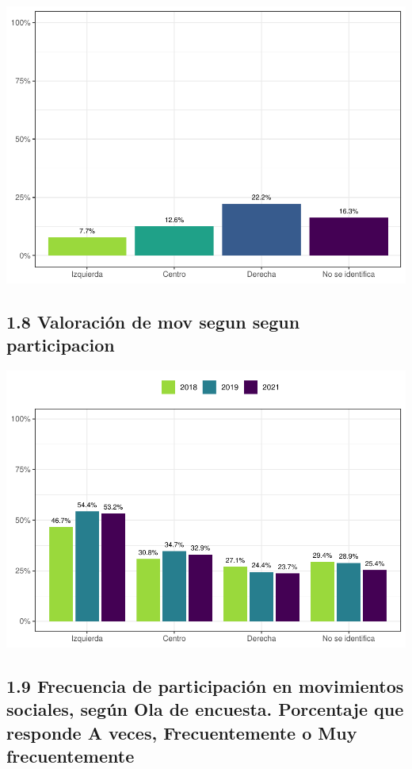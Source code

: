 \documentclass[
  12pt,
  openany]{book}
\begin{document}
\includegraphics{reporte-elsoc_files/figure-latex/unnamed-chunk-19-1.pdf}

\hypertarget{valoraciuxf3n-de-mov-segun-segun-participacion}{%
\subsection{1.8 Valoración de mov segun segun participacion}\label{valoraciuxf3n-de-mov-segun-segun-participacion}}

\includegraphics{reporte-elsoc_files/figure-latex/unnamed-chunk-21-1.pdf}

\hypertarget{frecuencia-de-participaciuxf3n-en-movimientos-sociales-seguxfan-ola-de-encuesta.-porcentaje-que-responde-a-veces-frecuentemente-o-muy-frecuentemente}{%
\subsection{1.9 Frecuencia de participación en movimientos sociales, según Ola de encuesta. Porcentaje que responde A veces, Frecuentemente o Muy frecuentemente}\label{frecuencia-de-participaciuxf3n-en-movimientos-sociales-seguxfan-ola-de-encuesta.-porcentaje-que-responde-a-veces-frecuentemente-o-muy-frecuentemente}}
\end{document}
